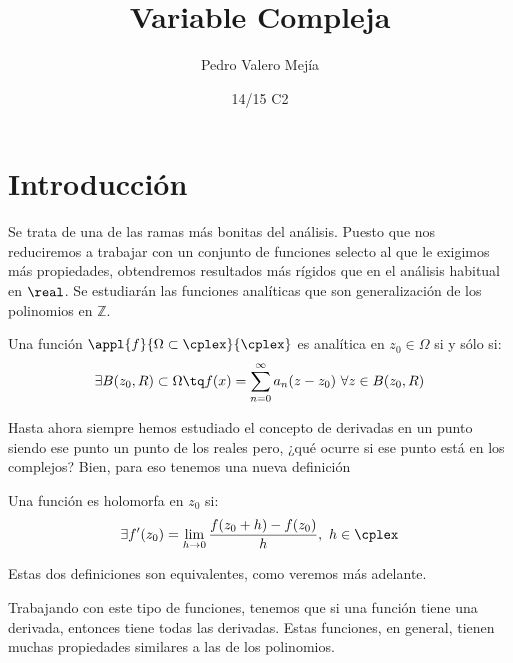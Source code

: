 \documentclass{apuntes}
\title{Variable Compleja}
\author{Pedro Valero Mejía}
\date{14/15 C2}
\begin{document}
\pagestyle{plain}
\maketitle

\tableofcontents
\newpage
\chapter{Introducción}
Se trata de una de las ramas más bonitas del análisis. Puesto que nos reduciremos a trabajar con un conjunto de funciones selecto al que le exigimos más propiedades, obtendremos resultados más rígidos que en el análisis habitual en $\real$. Se estudiarán las funciones analíticas que son generalización de los polinomios en $ℤ$.

\begin{defn}
Una función $\appl{f}{\Omega \subset \cplex}{\cplex}$ es analítica en $z_0\in\Omega$ si y sólo si:
\[\exists B(z_0,R)\subset \Omega \tq f(x)=\sum_{n=0}^{\infty}a_n(z-z_0) \ \forall z \in B(z_0, R)\]
\end{defn}

Hasta ahora siempre hemos estudiado el concepto de derivadas en un punto siendo ese punto un punto de los reales pero, ¿qué ocurre si ese punto está en los complejos? Bien, para eso tenemos una nueva definición

\begin{defn}
Una función es holomorfa en $z_0$ si:
\[\exists f'(z_0)=\lim_{h \to 0}\frac{f(z_0+h)-f(z_0)}{h}, \ h \in \cplex\]
\end{defn}

Estas dos definiciones son equivalentes, como veremos más adelante.

Trabajando con este tipo de funciones, tenemos que si una función tiene una derivada, entonces tiene todas las derivadas. Estas funciones, en general, tienen muchas propiedades similares a las de los polinomios.
\end{document}
